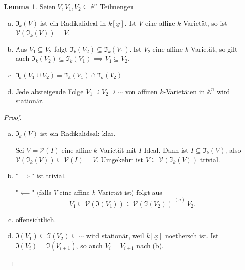 \documentclass[
twoside=semi,
fontsize=12,
DIV=12, 
cleardoublepage=current,
leqno,
headings=optiontoheadandtoc, 
toc=idx
]{scrbook}
\newcommand{\A}{\mathbb{A}}
\newcommand{\V}{\mathcal{V}}
\newcommand{\x}{\underline{x}}
\newcommand{\I}{\mathfrak{I}}
\theoremstyle{definition}
\newtheorem{lemma}[definition]{Lemma}
\begin{document}
	\begin{lemma}\label{1.2.7}\hfill\newline
		Seien $V, V_1, V_2 \subseteq \A^n$ Teilmengen
		
		\begin{enumerate}[(a)]
			\item $\I_k(V)$ ist ein Radikalideal in $k[\x]$. Ist $V$ eine affine $k$-Variet\"at, so ist $\V(\I_k(V)) = V$.
			
			\item Aus $V_1 \subseteq V_2$ folgt $\I_k(V_2) \subseteq \I_k(V_1)$. Ist $V_2$ eine affine $k$-Variet\"at, so gilt auch $\I_k(V_2) \subseteq \I_k(V_1) \implies V_1 \subseteq V_2$.
			
			\item $\I_k(V_1 \cup V_2) = \I_k(V_1) \cap \I_k(V_2)$.
			
			\item Jede absteigende Folge $V_1 \supseteq V_2 \supseteq \cdots$ von affinen $k$-Variet\"aten in $\A^n$ wird station\"ar.
		\end{enumerate}
	\end{lemma}

	\begin{proof}\hfill
		\begin{enumerate}[(a)]
			\item $\I_k(V)$ ist ein Radikalideal: klar.
			
			\medskip\noindent
			Sei $V = \V(I)$ eine affine $k$-Variet\"at mit $I$ Ideal. \newline Dann ist $I \subseteq \I_k(V)$, also $\V(\I_k(V)) \subseteq \V(I) = V$. Umgekehrt ist $V \subseteq \V(\I_k(V))$ trivial.
			
			\item "$\implies$" ist trivial.
			
			\medskip\noindent
			"$\impliedby$" (falls $V$ eine affine $k$-Variet\"at ist) folgt aus
				\[V_1 \subseteq \V(\I(V_1)) \subseteq \V(\I(V_2)) \overset{(a)}{=} V_2.\]
			
			\item offensichtlich.
			
			\item $\I(V_1) \subseteq \I(V_2) \subseteq \cdots$ wird station\"ar, weil $k[\x]$ noethersch ist. Ist $\I(V_i) = \I(V_{i+1})$, so auch $V_i = V_{i+1}$ nach (b).
		\end{enumerate}
	\end{proof}
\end{document}
